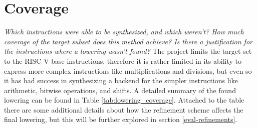 \section{Coverage}
\emph{Which instructions were able to be synthesized, and which weren't? How much coverage of the target
subset does this method achieve? Is there a justification for the instructions where a lowering wasn't found?}
\label{eval-coverage}
\newline
The project limits the target set to the RISC-V base instructions, therefore it is rather
limited in its ability to express more complex instructions like multiplications and 
divisions, but even so it has had success in synthesizing a backend for the simpler  
instructions like arithmetic, bitwise operations, and shifts. A detailed summary
of the found lowering can be found in Table \ref{tab:lowering_coverage}.
%
Attached to the table there are some additional details about how the refinement scheme
affects the final lowering, but this will be further explored in section \ref{eval-refinements}.
